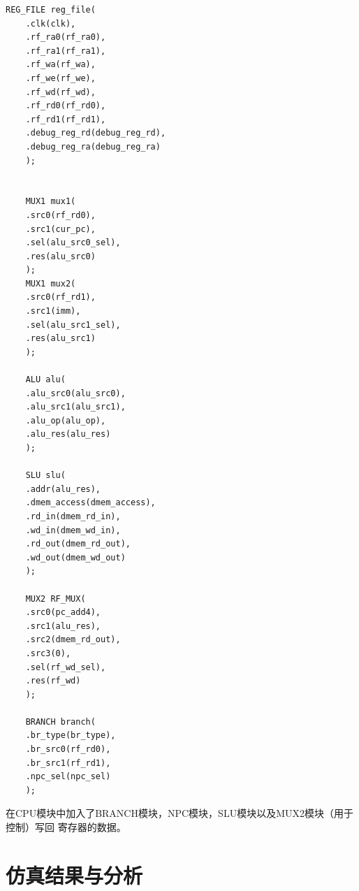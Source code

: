 \documentclass[12pt,a4paper]{ctexart}
\begin{document}
\begin{lstlisting}[style=verilog]
    REG_FILE reg_file(
    .clk(clk),
    .rf_ra0(rf_ra0),
    .rf_ra1(rf_ra1),
    .rf_wa(rf_wa),
    .rf_we(rf_we),
    .rf_wd(rf_wd),
    .rf_rd0(rf_rd0),
    .rf_rd1(rf_rd1),
    .debug_reg_rd(debug_reg_rd),
    .debug_reg_ra(debug_reg_ra)
    );
    
    
    MUX1 mux1(
    .src0(rf_rd0),
    .src1(cur_pc),
    .sel(alu_src0_sel),
    .res(alu_src0)
    );
    MUX1 mux2(
    .src0(rf_rd1),
    .src1(imm),
    .sel(alu_src1_sel),
    .res(alu_src1)
    );
    
    ALU alu(
    .alu_src0(alu_src0),
    .alu_src1(alu_src1),
    .alu_op(alu_op),
    .alu_res(alu_res)
    );
    
    SLU slu(
    .addr(alu_res),
    .dmem_access(dmem_access),
    .rd_in(dmem_rd_in),
    .wd_in(dmem_wd_in),
    .rd_out(dmem_rd_out),
    .wd_out(dmem_wd_out)
    );
    
    MUX2 RF_MUX(
    .src0(pc_add4),
    .src1(alu_res),
    .src2(dmem_rd_out),
    .src3(0),
    .sel(rf_wd_sel),
    .res(rf_wd)
    );
    
    BRANCH branch(
    .br_type(br_type),
    .br_src0(rf_rd0),
    .br_src1(rf_rd1),
    .npc_sel(npc_sel)
    );
\end{lstlisting}\par
在CPU模块中加入了BRANCH模块，NPC模块，SLU模块以及MUX2模块（用于控制）写回
寄存器的数据。
\section{仿真结果与分析}
\end{document}
